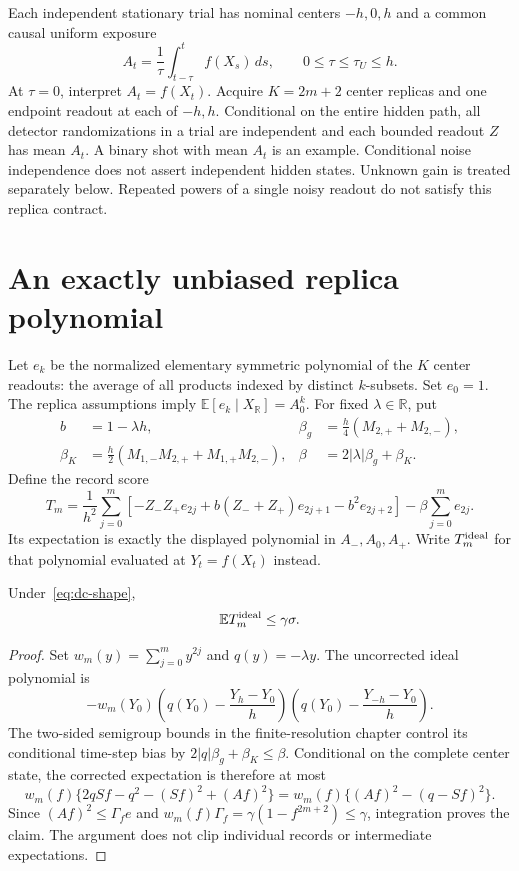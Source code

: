 Each independent stationary trial has nominal centers $-h,0,h$ and a common
causal uniform exposure
\begin{equation}
 A_t=\frac1\tau\int_{t-\tau}^t f(X_s)\,ds,
 \qquad 0\le\tau\le\tau_U\le h.
 \label{eq:dc-exposure}
\end{equation}
At $\tau=0$, interpret $A_t=f(X_t)$.  Acquire $K=2m+2$ center replicas and
one endpoint readout at each of $-h,h$.  Conditional on the entire hidden
path, all detector randomizations in a trial are independent and each
bounded readout $Z$ has mean $A_t$.  A binary shot with mean $A_t$ is an
example.  Conditional noise independence does not assert independent hidden
states.  Unknown gain is treated separately below.  Repeated powers of a
single noisy readout do not satisfy this replica contract.

\section{An exactly unbiased replica polynomial}

Let $e_k$ be the normalized elementary symmetric polynomial of the $K$
center readouts: the average of all products indexed by distinct
$k$-subsets.  Set $e_0=1$.  The replica assumptions imply
$\mathbb E[e_k\mid X_{\mathbb R}]=A_0^k$.
For fixed $\lambda\in\mathbb R$, put
\begin{align}
 b&=1-\lambda h,&
 \beta_g&=\frac h4(M_{2,+}+M_{2,-}),\\
 \beta_K&=\frac h2(M_{1,-}M_{2,+}+M_{1,+}M_{2,-}),&
 \beta&=2|\lambda|\beta_g+\beta_K.
 \label{eq:dc-beta}
\end{align}
Define the record score
\begin{equation}
 T_m=\frac1{h^2}\sum_{j=0}^m
 \left[-Z_-Z_+e_{2j}
       +b(Z_-+Z_+)e_{2j+1}-b^2e_{2j+2}\right]
       -\beta\sum_{j=0}^m e_{2j}.
 \label{eq:dc-replica-score}
\end{equation}
Its expectation is exactly the displayed polynomial in $A_-,A_0,A_+$.
Write $T_m^{\rm ideal}$ for that polynomial evaluated at
$Y_t=f(X_t)$ instead.

\begin{proposition}
Under~\eqref{eq:dc-shape},
\begin{equation}
 \mathbb E T_m^{\rm ideal}\le\gamma\sigma.
 \label{eq:dc-polynomial-physical}
\end{equation}
\end{proposition}
\begin{proof}
Set $w_m(y)=\sum_{j=0}^m y^{2j}$ and $q(y)=-\lambda y$.  The uncorrected
ideal polynomial is
\[
 -w_m(Y_0)
 \left(q(Y_0)-\frac{Y_h-Y_0}{h}\right)
 \left(q(Y_0)-\frac{Y_{-h}-Y_0}{h}\right).
\]
The two-sided semigroup bounds in the finite-resolution chapter control its
conditional time-step bias by $2|q|\beta_g+\beta_K\le\beta$.  Conditional on
the complete center state, the corrected expectation is therefore at most
\[
 w_m(f)\{2qSf-q^2-(Sf)^2+(Af)^2\}
 =w_m(f)\{(Af)^2-(q-Sf)^2\}.
\]
Since $(Af)^2\le\Gamma_f e$ and
$w_m(f)\Gamma_f=\gamma(1-f^{2m+2})\le\gamma$, integration proves the claim.
The argument does not clip individual records or intermediate expectations.
\end{proof}

